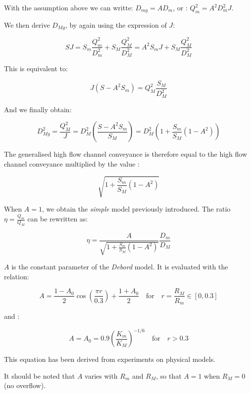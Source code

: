With the assumption above we can writte: $D_{mg} = A D_m$, or : $Q_{m}^2 = A^2 D_{m}^2 J$.

We then derive $D_{Mg}$, by again using the expression of $J$:

\begin{equation}
  S J = S_m \frac{Q_{m}^2}{D_{m}^2} + S_M \frac{Q_{M}^2}{D_{M}^2} = A^2 S_m J + S_M \frac{Q_{M}^2}{D_{M}^2}
\end{equation}

This is equivalent to:

\begin{equation}
  J ( S - A^2 S_m ) = Q_{M}^2 \frac{S_M}{D_{M}^2}
\end{equation}

And we finally obtain:

\begin{equation}
  D_{Mg}^2 = \frac{Q_{M}^2}{J} = D_{M}^2 \left ( \frac{S - A^2 S_m}{S_M}  \right ) = D_{M}^2 \left ( 1 + \frac{S_m}{S_M} ( 1 - A^2 )  \right )
\end{equation}

The generalised high flow channel conveyance is therefore equal to the high flow channel conveyance multiplied by the value :

$$
 \sqrt{1 + \frac{S_m}{S_M}(1-A^2)}
$$

When $A = 1$, we obtain the \textit{simple} model previously introduced. The ratio $\eta = \frac{Q_m}{Q_M}$ can be rewritten as:

\begin{equation}
  \eta = \frac{A}{\displaystyle \sqrt{1+\frac{S_m}{S_M}(1-A^2)}} \frac{D_m}{D_M}
\end{equation}

$A$ is the constant parameter of the \emph{Debord} model. It is evaluated with the relation:

\begin{equation}
  A = \frac{1-A_0}{2}\cos \left ( \frac{\pi r}{0.3} \right ) + \frac{1+A_0}{2} \quad \mbox{for} \quad r = \frac{R_M}{R_m} \in [0,0.3]
\end{equation}

and :

\begin{equation}
  A = A_0 = 0.9 \left ( \frac{K_m}{K_M} \right )^{-1/6} \quad \mbox{for} \quad r > 0.3
\end{equation}

This equation has been derived from experiments on physical models.

It should be noted that $A$ varies with $R_m$ and $R_M$, so that $A = 1$ when $R_M = 0$ (no overflow).

